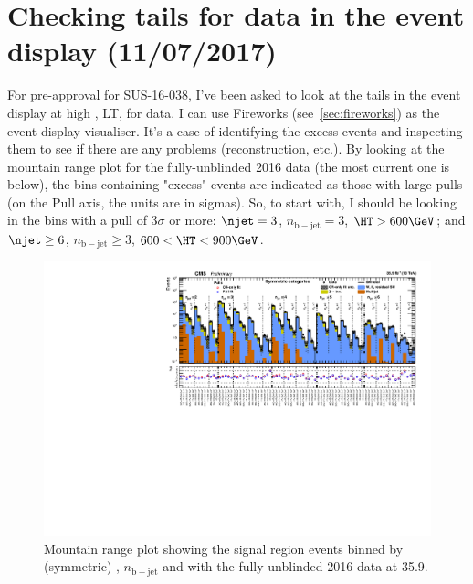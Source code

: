 
\chapter{Checking \texorpdfstring{\htmiss}{HTmiss} tails for data in the event display (11/07/2017)}

For pre-approval for SUS-16-038, I've been asked to look at the \htmiss tails in the event display at high \HT, LT, for data. I can use Fireworks (see~\ref{sec:fireworks}) as the event display visualiser. It's a case of identifying the excess events and inspecting them to see if there are any problems (reconstruction, etc.). By looking at the mountain range plot for the fully-unblinded 2016 data (the most current one is below), the bins containing "excess" events are indicated as those with large pulls (on the Pull axis, the units are in sigmas). So, to start with, I should be looking in the bins with a pull of 3$\sigma$ or more: $\njet = 3$, $n_{\mathrm{b-jet}} = 3$, $\HT > 600\GeV$; and $\njet \geq 6$, $n_{\mathrm{b-jet}} \geq 3$, $600 < \HT < 900\GeV$.

\begin{figure}[htbp]
\centering
\includegraphics[width=\textwidth]{figures/summaryPlot_Symmetric_prefit_overlay_fit_b.pdf}
\caption{Mountain range plot showing the signal region events binned by (symmetric) \njet, $n_{\mathrm{b-jet}}$ and \HT with the fully unblinded 2016 data at 35.9\fbinv. }
\end{figure}


